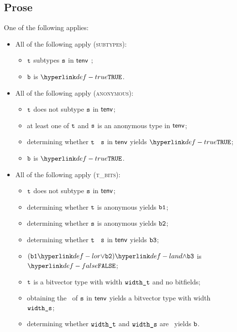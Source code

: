 \subsection{Prose}
One of the following applies:
 \begin{itemize}
  \item All of the following apply (\textsc{subtypes}):
    \begin{itemize}
    \item $\texttt{t}$ subtypes $\texttt{s}$ in $\textsf{tenv}$ ;
    \item $\texttt{b}$ is $\True$.
  \end{itemize}

  \item All of the following apply (\textsc{anonymous}):
  \begin{itemize}
    \item $\texttt{t}$ does not subtype $\texttt{s}$ in $\textsf{tenv}$;
    \item at least one of $\texttt{t}$ and $\texttt{s}$ is an anonymous type in $\textsf{tenv}$;
    \item determining whether $\texttt{t}$ \subtypesatisfies\ $\texttt{s}$ in $\textsf{tenv}$ yields $\True$\ProseOrTypeError;
    \item $\texttt{b}$ is $\True$.
  \end{itemize}

  \item All of the following apply (\textsc{t\_bits}):
  \begin{itemize}
    \item $\texttt{t}$ does not subtype $\texttt{s}$ in $\textsf{tenv}$;
    \item determining whether $\texttt{t}$ is anonymous yields $\texttt{b1}$;
    \item determining whether $\texttt{s}$ is anonymous yields $\texttt{b2}$;
    \item determining whether $\texttt{t}$ \subtypesatisfies\ $\texttt{s}$ in $\textsf{tenv}$ yields $\texttt{b3}$;
    \item $(\vbone \lor \vbtwo) \land \vbthree$ is $\False$;
    \item $\texttt{t}$ is a bitvector type with width $\texttt{width\_t}$ and no bitfields;
    \item obtaining the \structure\ of $\texttt{s}$ in $\textsf{tenv}$ yields a bitvector type with width \\
          $\texttt{width\_s}$\ProseOrTypeError;
    \item determining whether $\texttt{width\_t}$ and $\texttt{width\_s}$ are \bitwidthequivalent\ yields $\texttt{b}$.
  \end{itemize}


\end{itemize}
